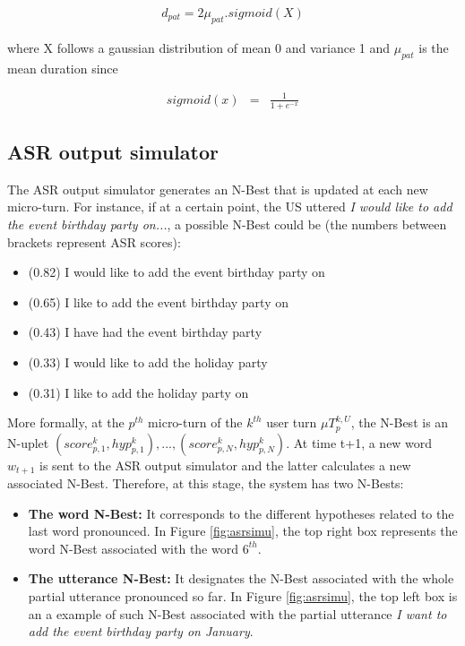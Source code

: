 					\begin{eqnarray}
						d_{pat} = 2 \mu_{pat}.sigmoid(X)
					\end{eqnarray}
					
					where X follows a gaussian distribution of mean 0 and variance 1 and $\mu_{pat}$ is the mean duration since
					
					\begin{eqnarray}
						sigmoid(x) & = & \frac{1}{1 + e^{-x}}
					\end{eqnarray}
					
					
	\subsection{ASR output simulator}
			
				The ASR output simulator generates an N-Best that is updated at each new micro-turn. For instance, if at a certain point, the US uttered \textit{I would like to add the event birthday party on...}, a possible N-Best could be (the numbers between brackets represent ASR scores):
					
					\begin{itemize}
						\item (0.82) I would like to add the event birthday party on
						\item (0.65) I like to add the event birthday party on
						\item (0.43) I have had the event birthday party
						\item (0.33) I would like to add the holiday party
						\item (0.31) I like to add the holiday party on
					\end{itemize}
					
					More formally, at the $p^{th}$ micro-turn of the $k^{th}$ user turn $\mu T^{k,U}_p$, the N-Best is an N-uplet ${(score^k_{p,1}, hyp^k_{p,1}),...,(score^k_{p,N}, hyp^k_{p,N})}$. At time t+1, a new word $w_{t+1}$ is sent to the ASR output simulator and the latter calculates a new associated N-Best. Therefore, at this stage, the system has two N-Bests:
					
					\begin{itemize}
						\item \textbf{The word N-Best:} It corresponds to the different hypotheses related to the last word pronounced. In Figure \ref{fig:asrsimu}, the top right box represents the word N-Best associated with the word $6^{th}$.
						\item \textbf{The utterance N-Best:} It designates the N-Best associated with the whole partial utterance pronounced so far. In Figure \ref{fig:asrsimu}, the top left box is an a example of such N-Best associated with the partial utterance \textit{I want to add the event birthday party on January}.
					\end{itemize}
					
